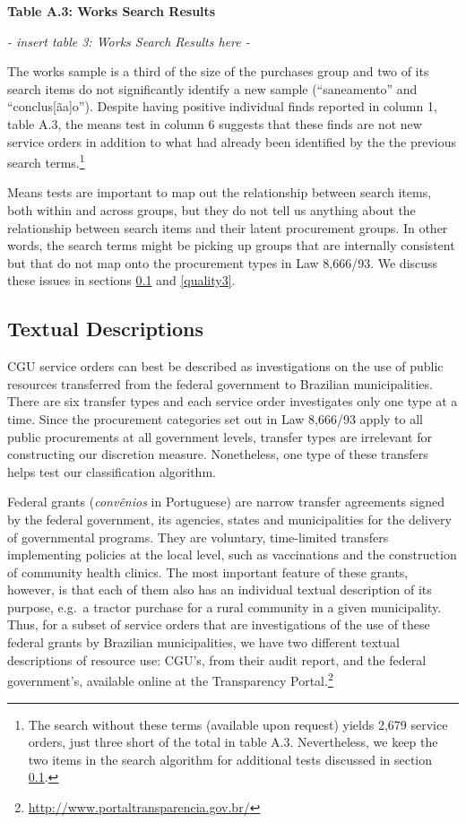 \documentclass[]{article}
\let\rmarkdownfootnote\footnote%
\def\footnote{\protect\rmarkdownfootnote}
\theoremstyle{definition}
\theoremstyle{definition}
\theoremstyle{definition}
\theoremstyle{remark}
\begin{document}
\textbf{Table A.3: Works Search Results}

\emph{- insert table 3: Works Search Results here -}

The works sample is a third of the size of the purchases group and two
of its search items do not significantly identify a new sample
(``saneamento'' and ``conclus{[}ãa{]}o''). Despite having positive
individual finds reported in column 1, table A.3, the means test in
column 6 suggests that these finds are not new service orders in
addition to what had already been identified by the the previous search
terms.\footnote{The search without these terms (available upon request)
  yields 2,679 service orders, just three short of the total in table
  A.3. Nevertheless, we keep the two items in the search algorithm for
  additional tests discussed in section \ref{quality2}.}

Means tests are important to map out the relationship between search
items, both within and across groups, but they do not tell us anything
about the relationship between search items and their latent procurement
groups. In other words, the search terms might be picking up groups that
are internally consistent but that do not map onto the procurement types
in Law 8,666/93. We discuss these issues in sections \ref{quality2} and
\ref{quality3}.

\hypertarget{quality2}{%
\subsection{Textual Descriptions}\label{quality2}}

CGU service orders can best be described as investigations on the use of
public resources transferred from the federal government to Brazilian
municipalities. There are six transfer types and each service order
investigates only one type at a time. Since the procurement categories
set out in Law 8,666/93 apply to all public procurements at all
government levels, transfer types are irrelevant for constructing our
discretion measure. Nonetheless, one type of these transfers helps test
our classification algorithm.

Federal grants (\emph{convênios} in Portuguese) are narrow transfer
agreements signed by the federal government, its agencies, states and
municipalities for the delivery of governmental programs. They are
voluntary, time-limited transfers implementing policies at the local
level, such as vaccinations and the construction of community health
clinics. The most important feature of these grants, however, is that
each of them also has an individual textual description of its purpose,
e.g.~a tractor purchase for a rural community in a given municipality.
Thus, for a subset of service orders that are investigations of the use
of these federal grants by Brazilian municipalities, we have two
different textual descriptions of resource use: CGU's, from their audit
report, and the federal government's, available online at the
Transparency Portal.\footnote{\url{http://www.portaltransparencia.gov.br/}}
\end{document}
